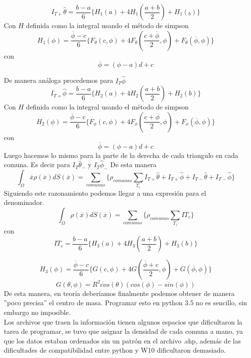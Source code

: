 \documentclass[20pt]{report}
\begin{document}
\begin{itemize}
\[I_{T+}\hat{\theta}=\frac{b-a}{6}\lbrace H_1(a)+4H_1(\frac{a+b}{2}) +H_1(_b) \rbrace\] 
Con $H$ definida  como la integral usando el m\'etodo de simpson
\[H_1(\phi)=\dfrac{\overline{\phi}-c}{6}\lbrace F_{\theta}(c,\phi) +4 F_{\theta}(\frac{c+\overline{\phi}}{2},\phi) +F_{\theta}(\overline{\phi},\phi) \rbrace\]
con
\[\overline{\phi}=(\phi-a)d+c\]
\pagebreak

De manera an\'aloga procedemos para $I_T\hat{\phi}$
\[I_{T+}\hat{\phi}=\frac{b-a}{6}\lbrace H_2(a)+4H_2(\frac{a+b}{2}) +H_2(b) \rbrace\] 
Con $H$ definida  como la integral usando el m\'etodo de simpson
\[H_2(\phi)=\dfrac{\overline{\phi}-c}{6}\lbrace F_{\phi}(c,\phi) +4 F_{\phi}(\frac{c+\overline{\phi}}{2},\phi) +F_{\phi}(\overline{\phi},\phi) \rbrace\]
con
\[\overline{\phi}=(\phi-a)d+c\]
Luego hacemos lo mismo para la parte de la derecha de cada triangulo en cada comuna. Es decir para $I_T\hat{\theta}_-$ y $I_T\hat{\phi}_-$ De esta manera
\begin{equation}
\int_{\Omega} \overline{x}\rho(\overline{x}) dS(\overline{x})=\sum_{comunas} \lbrace \rho_{comunas} \sum_{T_c}  I_{T+}\hat{\theta}+I_{T+}\hat{\phi}+I_{T-}\hat{\theta}+I_{T-}\hat{\phi} \rbrace 
\end{equation}
Siguiendo este razonamiento podemos llegar a una expresi\'on para el denominador.
\begin{equation}
\int_{\Omega} \rho(\overline{x}) dS(\overline{x})=\sum_{comunas} \lbrace \rho_{comunas} \sum_{T_c} IT_c \rbrace 
\end{equation}
con
\begin{equation}
IT_c=\frac{b-a}{6}\lbrace H_3(a)+4H_3(\frac{a+b}{2}) +H_3(b) \rbrace
\end{equation}

\begin{equation}
H_3(\phi)=\frac{\overline{\phi}-c}{6}\lbrace G(c,\phi)+4G(\frac{\overline{\phi}+c}{2},\phi) +G(\overline{\phi},\phi) \rbrace
\end{equation}
\begin{equation}
G(\theta,\phi)=R^2cos(\theta)(cos(\phi)-sin(\phi))
\end{equation}
De esta manera, en teor\'ia deber\'iamos finalmente podemos obtener de manera ''poco precisa'' el centro de masa.
Programar esto en python 3.5 no es sencillo, sin embargo no  imposible.\\
Los archivos que traen la informaci\'on tienen algunos espacios que dificultaron la tarea de programar, se tuvo que asignar la densidad de cada comuna a mano, ya que  los datos estaban ordenados sin un patr\'on en el archivo .shp, adem\'as de las dificultades de compatibilidad entre python y W10 dificultaron demasiado. 
\pagebreak


\end{itemize}
\end{document}
